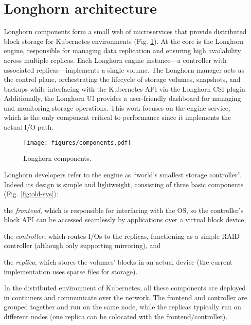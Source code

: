\section{Longhorn architecture}

Longhorn components form a small web of microservices that provide distributed block storage for Kubernetes environments (Fig. \ref{fig:components}). At the core is the Longhorn engine, responsible for managing data replication and ensuring high availability across multiple replicas. Each Longhorn engine instance---a controller with associated replicas---implements a single volume. The Longhorn manager acts as the control plane, orchestrating the lifecycle of storage volumes, snapshots, and backups while interfacing with the Kubernetes API via the Longhorn CSI plugin. Additionally, the Longhorn UI provides a user-friendly dashboard for managing and monitoring storage operations. This work focuses on the engine service, which is the only component critical to performance since it implements the actual I/O path.

\begin{figure}[thb]
    \centering
    \texttt{[image: figures/components.pdf]}
    \caption{Longhorn components.}
    \label{fig:components}
\end{figure}

Longhorn developers refer to the engine as ``world's smallest storage controller''. Indeed its design is simple and lightweight, consisting of three basic components (Fig. \ref{fig:old-sys}):
\begin{enumerate*}[label=(\roman*)]
    \item the \textit{frontend}, which is responsible for interfacing with the OS, so the controller's block API can be accessed seamlessly by applications over a virtual block device,
    \item the \textit{controller}, which routes I/Os to the replicas, functioning as a simple RAID controller (although only supporting mirroring), and
    \item the \textit{replica}, which stores the volumes' blocks in an actual device (the current implementation uses sparse files for storage).
\end{enumerate*}
In the distributed environment of Kubernetes, all these components are deployed in containers and communicate over the network. The frontend and controller are grouped together and run on the same node, while the replicas typically run on different nodes (one replica can be colocated with the frontend/controller).

